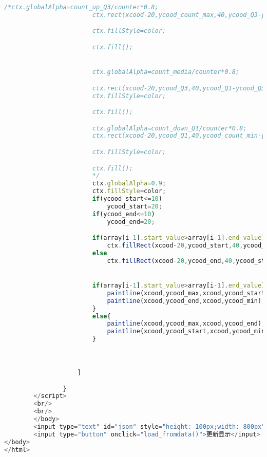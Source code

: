 \begin{lstlisting}[language = javascript]
						/*ctx.globalAlpha=count_up_Q3/counter*0.8;
						ctx.rect(xcood-20,ycood_count_max,40,ycood_Q3-ycood_count_max);

						ctx.fillStyle=color;

						ctx.fill();


						ctx.globalAlpha=count_media/counter*0.8;

						ctx.rect(xcood-20,ycood_Q3,40,ycood_Q1-ycood_Q3);
						ctx.fillStyle=color;

						ctx.fill();

						ctx.globalAlpha=count_down_Q1/counter*0.8;
						ctx.rect(xcood-20,ycood_Q1,40,ycood_count_min-ycood_Q1);

						ctx.fillStyle=color;

						ctx.fill();
						*/
						ctx.globalAlpha=0.9;
						ctx.fillStyle=color;
						if(ycood_start<=10)
							ycood_start=20;
						if(ycood_end<=10)
							ycood_end=20;

						if(array[i-1].start_value>array[i-1].end_value)
							ctx.fillRect(xcood-20,ycood_start,40,ycood_end-ycood_start);
						else
							ctx.fillRect(xcood-20,ycood_end,40,ycood_start-ycood_end);


						if(array[i-1].start_value>array[i-1].end_value){
							paintline(xcood,ycood_max,xcood,ycood_start);
							paintline(xcood,ycood_end,xcood,ycood_min);
						}
						else{
							paintline(xcood,ycood_max,xcood,ycood_end);
							paintline(xcood,ycood_start,xcood,ycood_min);
						}



					}

				}
		</script>
		<br/>
		<br/>
		</body>
		<input type="text" id="json" style="height: 100px;width: 800px"></input>
		<input type="button" onclick="load_fromdata()">更新显示</input>
</body>
</html>

\end{lstlisting}